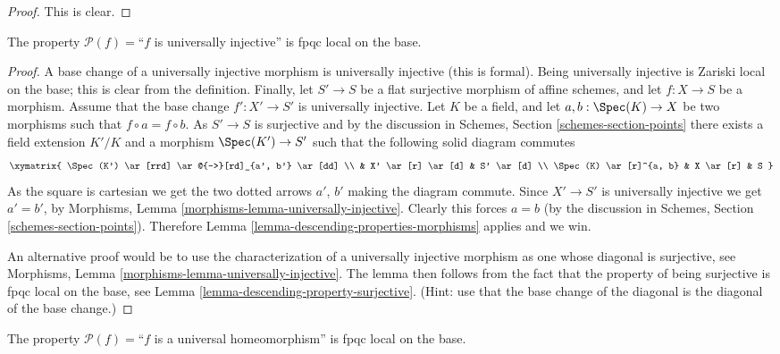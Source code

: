 \begin{proof}
This is clear.
\end{proof}

\begin{lemma}
\label{lemma-descending-property-universally-injective}
The property $\mathcal{P}(f) =$``$f$ is universally injective''
is fpqc local on the base.
\end{lemma}

\begin{proof}
A base change of a universally injective morphism is universally
injective (this is formal). Being universally injective is Zariski
local on the base; this is clear from the definition.
Finally, let
$S' \to S$ be a flat surjective morphism of affine schemes,
and let $f : X \to S$ be a morphism. Assume that the base change
$f' : X' \to S'$ is universally injective. Let $K$ be a field, and let
$a, b : \Spec(K) \to X$ be two morphisms such that
$f \circ a = f \circ b$. As $S' \to S$ is surjective and
by the discussion in Schemes,
Section \ref{schemes-section-points} there exists a field
extension $K'/K$ and a morphism $\Spec(K')
\to S'$ such that the following solid diagram commutes
$$
\xymatrix{
\Spec(K') \ar[rrd] \ar@{-->}[rd]_{a', b'} \ar[dd] \\
 &
X' \ar[r] \ar[d] &
S' \ar[d] \\
\Spec(K) \ar[r]^{a, b} &
X \ar[r] &
S
}
$$
As the square is cartesian we get the two dotted arrows $a'$, $b'$ making the
diagram commute. Since $X' \to S'$ is universally injective we get $a' = b'$,
by
Morphisms, Lemma \ref{morphisms-lemma-universally-injective}.
Clearly this forces $a = b$ (by the discussion in Schemes,
Section \ref{schemes-section-points}).
Therefore Lemma \ref{lemma-descending-properties-morphisms} applies and we win.

\medskip\noindent
An alternative proof would be to use the characterization of a universally
injective morphism as one whose diagonal is surjective, see
Morphisms, Lemma \ref{morphisms-lemma-universally-injective}.
The lemma then follows from the fact that
the property of being surjective is fpqc local on the base, see
Lemma \ref{lemma-descending-property-surjective}.
(Hint: use that the base change of the diagonal is the diagonal
of the base change.)
\end{proof}

\begin{lemma}
\label{lemma-descending-property-universal-homeomorphism}
The property $\mathcal{P}(f) =$``$f$ is a universal homeomorphism''
is fpqc local on the base.
\end{lemma}

